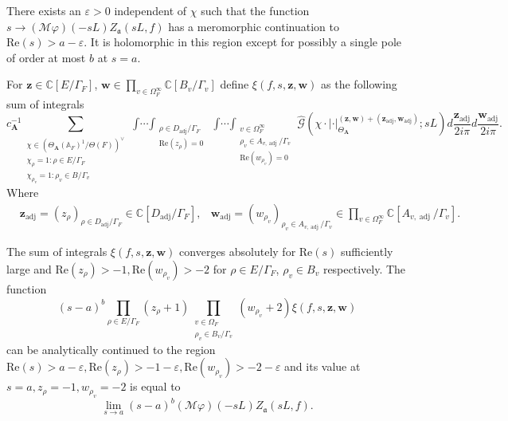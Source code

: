 \documentclass[10pt,a4paper]{amsart}
\DeclareMathOperator{\adj}{adj}
\newcommand{\A}{\mathbb{A}}
\newcommand{\C}{\mathbb{C}}
\renewcommand{\Re}{\mathrm{Re}}
\begin{document}
\begin{lemma}\label{lem: Moving the contours}
	There exists an $\varepsilon > 0$ independent of $\chi$ such that the function $s \to (\mathcal{M} \varphi)(-sL )Z_{\mathfrak{a}}(s L, f)$ has a meromorphic continuation to $\Re(s) > a - \varepsilon$. It is holomorphic in this region except for possibly a single pole of order at most $b$ at $s = a$.
	
	For $\bm{z} \in \C[E / \Gamma_F]$, $\bm{w} \in \prod_{v \in \Omega_{F}^{\infty}} \C[B_v/\Gamma_v]$ define $\xi(f, s, \bm{z}, \bm{w})$ as the following sum of integrals
	\begin{equation}\label{eq:Definition of xi}
		c_{\mathbf{A}}^{-1}
		\sum_{\substack{\chi \in (\Theta_{\mathbf{A}}(\A_F)^1/\Theta(F))^{\vee} \\ \chi_{\rho} = 1: \rho \in E/\Gamma_F \\ \chi_{\rho_v} = 1: \rho_v \in B/\Gamma_v}}
		\mathop{\int \cdots \int}_{\substack{\rho \in D_{\adj} / \Gamma_F \\ \Re(z_{\rho}) = 0}}\mathop{\int \cdots \int}_{\substack{v \in \Omega_F^{\infty} \\ \rho_v \in A_{v, \adj} /\Gamma_v \\ \Re(w_{\rho_v}) = 0}} 
		\hat{\mathcal{G}}(\chi \cdot | \cdot|_{\Theta_{\mathbf{A}}}^{(\bm{z}, \bm{w}) + (\bm{z}_{\adj}, \bm{w}_{\adj})}; s L) d\frac{\bm{z}_{\adj}}{2 i \pi} d \frac{\bm{w}_{\adj}}{2 i \pi}.
	\end{equation}
	Where 
	\begin{align*}
		&\bm{z}_{\adj} = (z_{\rho})_{\rho \in D_{\adj} / \Gamma_F} \in \C[D_{\adj} / \Gamma_F], &\bm{w}_{\adj} = (w_{\rho_v})_{\rho_v \in A_{v, \adj}/\Gamma_v} \in \prod_{v \in \Omega_{F}^{\infty}} \C[A_{v, \adj}/\Gamma_v].
	\end{align*}
	
	The sum of integrals $\xi(f, s, \bm{z}, \bm{w})$ converges absolutely for $\Re(s)$ sufficiently large and $\Re(z_{\rho}) > -1, \Re(w_{\rho_v}) > -2$ for $\rho \in E/ \Gamma_F$, $\rho_v \in B_v$ respectively. The function 
	\[
	(s - a)^b \prod_{\rho \in E / \Gamma_F} (z_{\rho} + 1) \prod_{\substack{v \in \Omega_F \\ \rho_v \in B_v/\Gamma_v}} (w_{\rho_v} + 2)\xi(f, s, \bm{z}, \bm{w})
	\] 
	can be analytically continued to the region $\Re(s) > a - \varepsilon, \Re(z_{\rho}) > -1 - \varepsilon, \Re(w_{\rho_v}) > -2 - \varepsilon$ and its value at $s = a, z_{\rho} = -1, w_{\rho_v} = -2 $ is equal to 
	\[
	\lim_{s \to a} (s - a)^b (\mathcal{M} \varphi)(-sL )Z_{\mathfrak{a}}(s L, f).
	\]
	\end{lemma}
\end{document}
